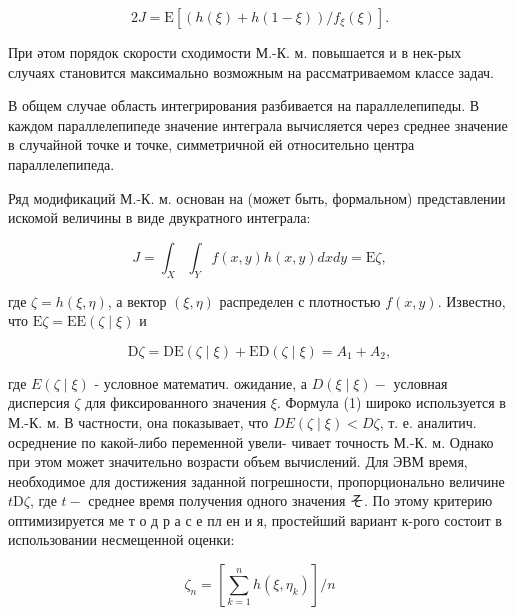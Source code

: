 \documentclass[10pt]{article}
\begin{document}
\[

2 J=\mathrm{E}\left[(h(\xi)+h(1-\xi)) / f_{\xi}(\xi)\right] .

\]



При әтом порядок скорости сходимости М.-К. м. повышается и в нек-рых случаях становится максимально возможным на рассматриваемом классе задач.



В общем случае область интегрирования разбивается на параллелепипеды. В каждом параллелепипеде значение интеграла вычисляется через среднее значение в случайной точке и точке, симметричной ей относительно центра параллелепипеда.



Ряд модификаций М.-К. м. основан на (может быть, формальном) представлении искомой величины в виде двукратного интеграла:



\[

J=\int_{X} \int_{Y} f(x, y) h(x, y) d x d y=\mathrm{E} \zeta,

\]



где $\zeta=h(\xi, \eta)$, а вектор $(\xi, \eta)$ распределен с плотностью $f(x, y)$. Известно, что $\mathrm{E} \zeta=\mathrm{EE}(\zeta \mid \xi)$ и



\[

\mathrm{D} \zeta=\mathrm{DE}(\zeta \mid \xi)+\mathrm{ED}(\zeta \mid \xi)=A_{1}+A_{2},

\]



где $E(\zeta \mid \xi)$ - условное математич. ожидание, а $D(\xi \mid \xi)-$ условная дисперсия $\zeta$ для фиксированного значения $\xi$. Формула (1) широко используется в М.-К. м. В частности, она показывает, что $D E(\zeta \mid \xi)<D \zeta$, т. е. аналитич. осреднение по какой-либо переменной увели- чивает точность М.-К. м. Однако при этом может значительно возрасти объем вычислений. Для ЭВМ время, необходимое для достижения заданной погрешности, пропорционально величине $t \mathrm{D} \zeta$, где $t-$ среднее время получения одного значения そ. По этому критерию оптимизируется ме т о д р а с е пл ен и я, простейший вариант к-рого состоит в использовании несмещенной оценки:



\[

\zeta_{n}=\left[\sum_{k=1}^{n} h\left(\xi, \eta_{k}\right)\right] / n

\]
\end{document}
